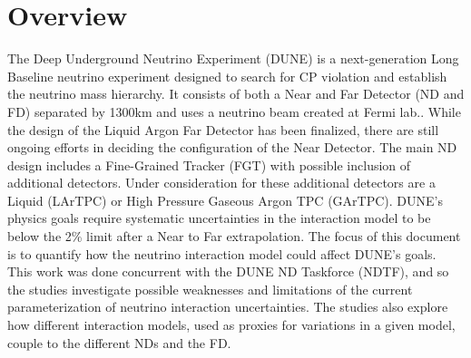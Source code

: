 \documentclass[12pt]{article}
\begin{document}
\section{Overview}\label{sec:view}


The Deep Underground Neutrino Experiment (DUNE) is a next-generation Long Baseline neutrino experiment designed to search for CP violation and establish the neutrino mass hierarchy. It consists of both a Near and Far Detector (ND and FD) separated by 1300km and uses a neutrino beam created at Fermi lab.\cite{DUNE_CDR1}. While the design of the Liquid Argon Far Detector has been finalized, there are still ongoing efforts in deciding the configuration of the Near Detector. The main ND design includes a Fine-Grained Tracker (FGT) with possible inclusion of additional detectors. Under consideration for these additional detectors are a Liquid (LArTPC) or High Pressure Gaseous Argon TPC (GArTPC). DUNE's physics goals require systematic uncertainties in the interaction model to be below the 2\% limit after a Near to Far extrapolation\cite{DUNE_review}. The focus of this document is to quantify how the neutrino interaction model could affect DUNE's goals. This work was done concurrent with the DUNE ND Taskforce (NDTF), and so the studies investigate possible weaknesses and limitations of the current parameterization of neutrino interaction uncertainties. The studies also explore how different interaction models, used as proxies for variations in a given model, couple to the different NDs and the FD.
\end{document}
